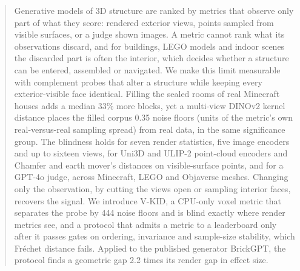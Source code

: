 \begin{abstract}
Generative models of 3D structure are ranked by metrics that observe only part of what they score: rendered exterior views, points sampled from visible surfaces, or a judge shown images. A metric cannot rank what its observations discard, and for buildings, LEGO models and indoor scenes the discarded part is often the interior, which decides whether a structure can be entered, assembled or navigated. We make this limit measurable with complement probes that alter a structure while keeping every exterior-visible face identical. Filling the sealed rooms of real Minecraft houses adds a median 33\% more blocks, yet a multi-view DINOv2 kernel distance places the filled corpus 0.35 noise floors (units of the metric's own real-versus-real sampling spread) from real data, in the same significance group. The blindness holds for seven render statistics, five image encoders and up to sixteen views, for Uni3D and ULIP-2 point-cloud encoders and Chamfer and earth mover's distances on visible-surface points, and for a GPT-4o judge, across Minecraft, LEGO and Objaverse meshes. Changing only the observation, by cutting the views open or sampling interior faces, recovers the signal. We introduce V-KID, a CPU-only voxel metric that separates the probe by 444 noise floors and is blind exactly where render metrics see, and a protocol that admits a metric to a leaderboard only after it passes gates on ordering, invariance and sample-size stability, which Fr\'echet distance fails. Applied to the published generator BrickGPT, the protocol finds a geometric gap 2.2 times its render gap in effect size.
\end{abstract}

